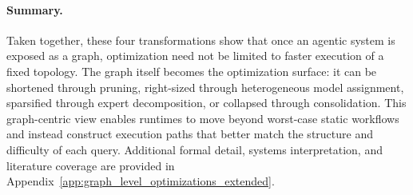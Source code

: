 \paragraph{Summary.}
Taken together, these four transformations show that once an agentic system is exposed as a graph, optimization need not be limited to faster execution of a fixed topology. The graph itself becomes the optimization surface: it can be shortened through pruning, right-sized through heterogeneous model assignment, sparsified through expert decomposition, or collapsed through consolidation. This graph-centric view enables runtimes to move beyond worst-case static workflows and instead construct execution paths that better match the structure and difficulty of each query. Additional formal detail, systems interpretation, and literature coverage are provided in Appendix~\ref{app:graph_level_optimizations_extended}.



